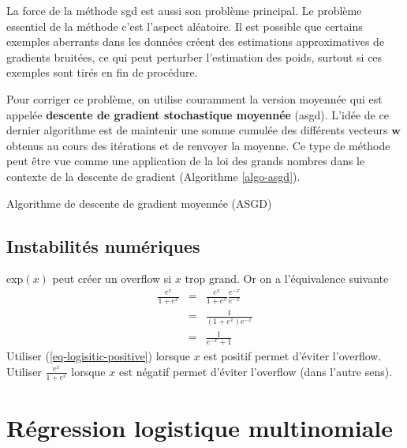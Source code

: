 \documentclass[11pt,openany]{book}
\newcommand{\ac}[1]{{\sc #1}} %
\newcommand{\kw}[1]{{\bf #1}} %
\begin{document}
La force de la méthode \ac{sgd} est aussi son problème principal.
Le problème essentiel de la méthode c'est l'aspect aléatoire.
Il est possible que certains exemples aberrants dans les données
créent des estimations approximatives de gradients bruitées, ce qui
peut perturber l'estimation des poids, surtout si ces exemples sont
tirés en fin de procédure.

Pour corriger ce problème, on utilise couramment la version moyennée
qui est appelée \kw{descente de gradient stochastique moyennée} (\ac{asgd}).
L'idée de ce dernier algorithme est de maintenir une somme cumulée des
différents vecteurs $\mathbf{w}$ obtenus au cours des itérations et de
renvoyer la moyenne. Ce type de méthode peut être vue comme une
application de la loi des grands nombres dans le contexte de la descente
de gradient (Algorithme \ref{algo-asgd}).  
\begin{algorithm}[htbp]
\caption{\label{algo-asgd}Algorithme de descente de gradient moyennée (ASGD)}
\end{algorithm}


\subsection{Instabilités numériques}

$(x)$ peut créer un overflow si $x$ trop grand.
Or on a l'équivalence suivante
\begin{eqnarray}
\frac{e^x}{1+e^x} &= &\frac{e^x}{1+e^x} \frac{e^{-x}}{e^{-x}}\\
&=&\frac{1}{(1+e^x)e^{-x}}\\
\label{eq-logisitic-positive}&=&\frac{1}{e^{-x}+1}
\end{eqnarray}
Utiliser (\ref{eq-logisitic-positive}) lorsque $x$ est positif permet
d'éviter l'overflow. Utiliser $$ lorsque $x$ est
négatif permet d'éviter l'overflow (dans l'autre sens).


\section{Régression logistique multinomiale}
\end{document}
